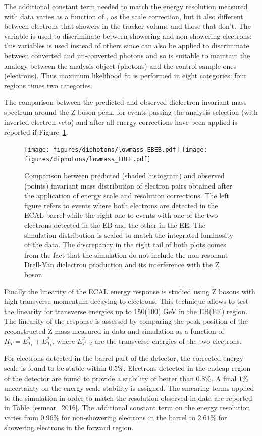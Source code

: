 The additional constant term needed to match the energy resolution measured with data varies as a function
of \scEta, as the scale correction, but it also different between electrons that showers in the tracker volume
and those that don't.
The \rnine variable is used to discriminate between showering and non-showering electrons: this variables is used
instead of others since can also be applied to discriminate between converted and un-converted photons and
so is suitable to maintain the analogy between the analysis object (photons) and the control sample ones (electrons).
Thus maximum likelihood fit is performed in eight categories: four \scEta regions times two \rnine categories.

The comparison between the predicted and observed dielectron invariant mass spectrum around the Z boson peak,
for events passing the analysis selection (with inverted electron veto) and after all energy corrections have been applied
is reported if Figure~\ref{z_peaks}.

\begin{figure}[!h]
  \centering
  \texttt{[image: figures/diphotons/lowmass\_EBEB.pdf]}
  \texttt{[image: figures/diphotons/lowmass\_EBEE.pdf]}
  \caption{Comparison between predicted (shaded histogram) and observed (points) invariant mass distribution
    of electron pairs obtained after the application of energy scale and resolution corrections.
    The left figure refers to events where both electrons are detected in the ECAL barrel while the right one
    to events with one of the two electrons detected in the EB and the other in the EE.
    The simulation distribution is scaled to match the integrated luminosity of the data.
    The discrepancy in the right tail of both plots comes from the fact that the simulation do not include
  the non resonant Drell-Yan dielectron production and its interference with the Z boson.}
  \label{z_peaks}
\end{figure}  

Finally the linearity of the ECAL energy response is studied using Z bosons with high transverse momentum
decaying to electrons. This technique allows to test the linearity for transverse energies up to 150(100) GeV in
the EB(EE) region.
The linearity of the response is assessed by comparing the peak position of the
reconstructed Z mass measured in data and simulation as a function of $H_T = E_{T_1}^2 + E_{T_1}^2$, where
$E_{T_1,2}^2$ are the transverse energies of the two electrons.

For electrons detected in the barrel part of the detector, the corrected energy scale
is found to be stable within $0.5\%$. Electrons detected in the endcap region of the
detector are found to provide a stability of better than $0.8\%$.
A final $1\%$ uncertainty on the energy scale stability is assigned.
The smearing terms applied to the simulation in order to match the resolution observed in data are reported in
Table~\ref{esmear_2016}. The additional constant term on the energy resolution varies from $0.96\%$ for
non-showering electrons in the barrel to $2.61\%$ for showering electrons in the forward region.

